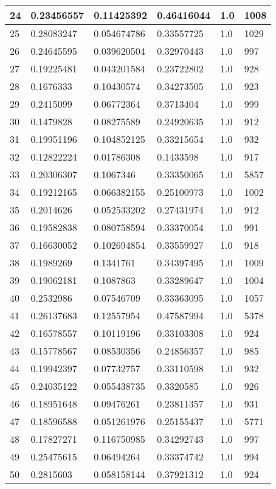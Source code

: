 \begin{longtable}{|l|l|l|l|l|l|}
24 & 0.23456557 & 0.11425392 & 0.46416044 & 1.0 & 1008 \\ \hline 
25 & 0.28083247 & 0.054674786 & 0.33557725 & 1.0 & 1029 \\ \hline 
26 & 0.24645595 & 0.039620504 & 0.32970443 & 1.0 & 997 \\ \hline 
27 & 0.19225481 & 0.043201584 & 0.23722802 & 1.0 & 928 \\ \hline 
28 & 0.1676333 & 0.10430574 & 0.34273505 & 1.0 & 923 \\ \hline 
29 & 0.2415099 & 0.06772364 & 0.3713404 & 1.0 & 999 \\ \hline 
30 & 0.1479828 & 0.08275589 & 0.24920635 & 1.0 & 912 \\ \hline 
31 & 0.19951196 & 0.104852125 & 0.33215654 & 1.0 & 932 \\ \hline 
32 & 0.12822224 & 0.01786308 & 0.1433598 & 1.0 & 917 \\ \hline 
33 & 0.20306307 & 0.1067346 & 0.33350065 & 1.0 & 5857 \\ \hline 
34 & 0.19212165 & 0.066382155 & 0.25100973 & 1.0 & 1002 \\ \hline 
35 & 0.2014626 & 0.052533202 & 0.27431974 & 1.0 & 912 \\ \hline 
36 & 0.19582838 & 0.080758594 & 0.33370054 & 1.0 & 991 \\ \hline 
37 & 0.16630052 & 0.102694854 & 0.33559927 & 1.0 & 918 \\ \hline 
38 & 0.1989269 & 0.1341761 & 0.34397495 & 1.0 & 1009 \\ \hline 
39 & 0.19062181 & 0.1087863 & 0.33289647 & 1.0 & 1004 \\ \hline 
40 & 0.2532986 & 0.07546709 & 0.33363095 & 1.0 & 1057 \\ \hline 
41 & 0.26137683 & 0.12557954 & 0.47587994 & 1.0 & 5378 \\ \hline 
42 & 0.16578557 & 0.10119196 & 0.33103308 & 1.0 & 924 \\ \hline 
43 & 0.15778567 & 0.08530356 & 0.24856357 & 1.0 & 985 \\ \hline 
44 & 0.19942397 & 0.07732757 & 0.33110598 & 1.0 & 932 \\ \hline 
45 & 0.24035122 & 0.055438735 & 0.3320585 & 1.0 & 926 \\ \hline 
46 & 0.18951648 & 0.09476261 & 0.23811357 & 1.0 & 931 \\ \hline 
47 & 0.18596588 & 0.051261976 & 0.25155437 & 1.0 & 5771 \\ \hline 
48 & 0.17827271 & 0.116750985 & 0.34292743 & 1.0 & 997 \\ \hline 
49 & 0.25475615 & 0.06494264 & 0.33374742 & 1.0 & 994 \\ \hline 
50 & 0.2815603 & 0.058158144 & 0.37921312 & 1.0 & 924 \\ \hline 
\end{longtable}